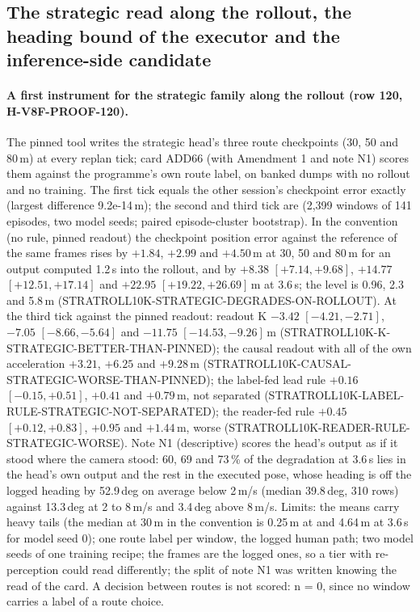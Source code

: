 \subsection{The strategic read along the rollout, the heading bound of the executor and the inference-side candidate}\label{sec:strat}
\paragraph{A first instrument for the strategic family along the rollout (row 120, H-V8F-PROOF-120).} The pinned tool writes the strategic head's three route checkpoints (30, 50 and 80\,m) at every replan tick; card ADD66 (with Amendment 1 and note N1) scores them against the programme's own route label, on banked dumps with no rollout and no training. The first tick equals the other session's checkpoint error exactly (largest difference 9.2e-14\,m); the second and third tick are  (2,399 windows of 141 episodes, two model seeds; paired episode-cluster bootstrap). In the convention (no rule, pinned readout) the checkpoint position error against the  reference of the same frames rises by $+1.84$, $+2.99$ and $+4.50$\,m at 30, 50 and 80\,m for an output computed 1.2\,s into the rollout, and by $+8.38$ $[+7.14,+9.68]$, $+14.77$ $[+12.51,+17.14]$ and $+22.95$ $[+19.22,+26.69]$\,m at 3.6\,s; the  level is 0.96, 2.3 and 5.8\,m (STRATROLL10K-STRATEGIC-DEGRADES-ON-ROLLOUT). At the third tick against the pinned readout: readout K $-3.42$ $[-4.21,-2.71]$, $-7.05$ $[-8.66,-5.64]$ and $-11.75$ $[-14.53,-9.26]$\,m (STRATROLL10K-K-STRATEGIC-BETTER-THAN-PINNED); the causal readout with all of the own acceleration $+3.21$, $+6.25$ and $+9.28$\,m (STRATROLL10K-CAUSAL-STRATEGIC-WORSE-THAN-PINNED); the label-fed lead rule $+0.16$ $[-0.15,+0.51]$, $+0.41$ and $+0.79$\,m, not separated (STRATROLL10K-LABEL-RULE-STRATEGIC-NOT-SEPARATED); the reader-fed rule $+0.45$ $[+0.12,+0.83]$, $+0.95$ and $+1.44$\,m, worse (STRATROLL10K-READER-RULE-STRATEGIC-WORSE). Note N1 (descriptive) scores the head's output as if it stood where the camera stood: 60, 69 and 73\,\% of the degradation at 3.6\,s lies in the head's own output and the rest in the executed pose, whose heading is off the logged heading by 52.9\,deg on average below 2\,m/s (median 39.8\,deg, 310 rows) against 13.3\,deg at 2 to 8\,m/s and 3.4\,deg above 8\,m/s. Limits: the means carry heavy tails (the median at 30\,m in the convention is 0.25\,m at  and 4.64\,m at 3.6\,s for model seed 0); one route label per window, the logged human path; two model seeds of one training recipe; the frames are the logged ones, so a tier with re-perception could read differently; the split of note N1 was written knowing the read of the card. A decision between routes is not scored: n = 0, since no window carries a label of a route choice.


